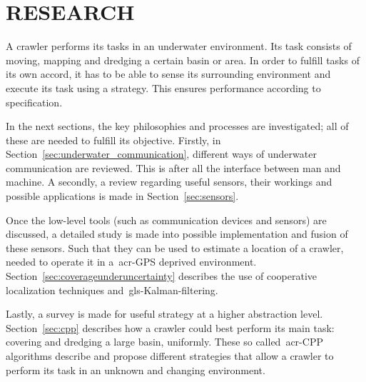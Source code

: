 

\chapter{RESEARCH}\label{chap:research}
A crawler performs its tasks in an underwater environment. Its task consists of moving, mapping and dredging a 
certain basin or area. In order to fulfill tasks of its own accord, it has to be able to sense its surrounding 
environment and execute its task using a strategy. This ensures performance according to specification.

In the next sections, the key philosophies and processes are investigated; all of these are needed to fulfill its 
objective. Firstly, in Section~\ref{sec:underwater_communication}, different ways of underwater communication are 
reviewed. This is after all the interface between man and machine. A secondly, a review regarding useful sensors, their
workings and possible applications is made in Section~\ref{sec:sensors}.

Once the low-level tools (such as communication devices and sensors) are discussed, a detailed study is made into 
possible implementation and fusion of these sensors. Such that they can be used to estimate a location of a crawler, 
needed to operate it in a~\gls{acr-GPS} deprived environment. Section~\ref{sec:coverageunderuncertainty} describes 
the use of cooperative localization techniques and~\gls{gls-Kalman-filter}ing.

Lastly, a survey is made for useful strategy at a higher abstraction level. Section~\ref{sec:cpp} describes how a 
crawler could best perform its main task: covering and dredging a large basin, uniformly. These so 
called~\gls{acr-CPP} algorithms describe and propose different strategies that allow a crawler to perform its task 
in an unknown and changing environment.
